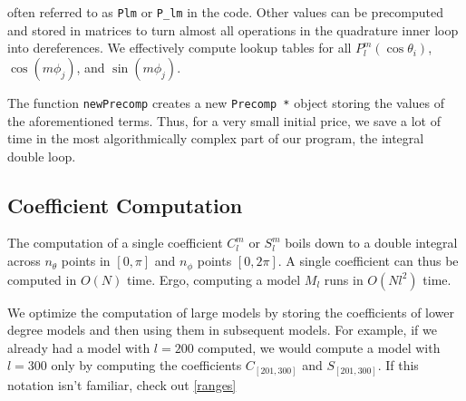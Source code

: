 \documentclass[a4paper]{article}
\theoremstyle{definition}
\begin{document}
often referred to as \texttt{Plm} or \texttt{P\_lm} in the code. Other values can be precomputed and stored in matrices to turn almost all operations
in the quadrature inner loop into dereferences. We effectively compute lookup tables for all $P_l^m(\cos \theta_i)$, $\cos(m\phi_j)$, and $\sin(m\phi_j)$.

The function \texttt{newPrecomp} creates a new \texttt{Precomp *} object storing the values of the aforementioned terms. Thus, for a very small initial price,
we save a lot of time in the most algorithmically complex part of our program, the integral double loop.


\subsection{Coefficient Computation}

The computation of a single coefficient $C_l^m$ or $S_l^m$ boils down to a double integral across $n_\theta$ points in $[0, \pi]$
and $n_\phi$ points $[0, 2\pi]$. A single coefficient can thus be computed in $O(N)$ time. Ergo, computing a model $M_l$ runs in 
$O(Nl^2)$ time.

We optimize the computation of large models by storing the coefficients of lower degree models and then using them in subsequent 
models. For example, if we already had a model with $l = 200$ computed, we would compute a model with $l = 300$ only by computing 
the coefficients $C_{[201, 300]}$ and $S_{[201, 300]}$. If this notation isn't familiar, check out \ref{ranges}

\nocite{*}



\end{document}
